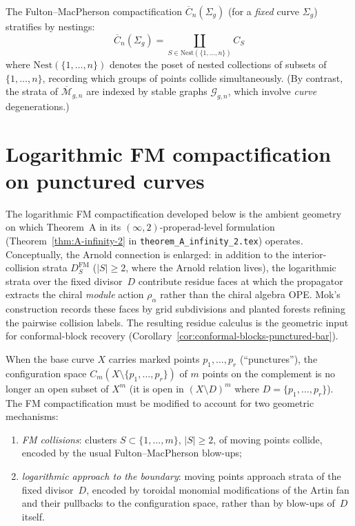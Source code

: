 The Fulton--MacPherson compactification $\overline{C}_n(\Sigma_g)$ (for a \emph{fixed} curve $\Sigma_g$) stratifies by nestings:
\[\overline{C}_n(\Sigma_g) = \coprod_{S \in \mathrm{Nest}(\{1,\ldots,n\})} C_S\]
where $\mathrm{Nest}(\{1,\ldots,n\})$ denotes the poset of nested collections of subsets of $\{1,\ldots,n\}$, recording which groups of points collide simultaneously. (By contrast, the strata of $\overline{\mathcal{M}}_{g,n}$ are indexed by stable graphs $\mathcal{G}_{g,n}$, which involve \emph{curve} degenerations.)

\section{Logarithmic FM compactification on punctured curves}
\label{sec:log-fm-punctured}

The logarithmic FM compactification developed below is the
ambient geometry on which Theorem~A in its
$(\infty,2)$-properad-level formulation
(Theorem~\ref{thm:A-infinity-2} in
\texttt{theorem\_A\_infinity\_2.tex}) operates. Conceptually,
the Arnold connection is enlarged: in addition to the
interior-collision strata $D_S^{\mathrm{FM}}$ ($|S|\geq2$, where
the Arnold relation lives), the logarithmic strata over the fixed
divisor~$D$ contribute residue faces at which the propagator extracts
the chiral \emph{module} action $\rho_\alpha$ rather than the chiral
algebra OPE. Mok's construction records these faces by grid
subdivisions and planted forests refining the pairwise collision labels.
The resulting residue calculus is the geometric input for
conformal-block recovery
(Corollary~\ref{cor:conformal-blocks-punctured-bar}).

When the base curve $X$ carries marked points $p_1, \ldots, p_r$
(``punctures''), the configuration space $C_m(X \setminus \{p_1,
\ldots, p_r\})$ of $m$ points on the complement is no longer an
open subset of $X^m$ (it is open in $(X \setminus D)^m$ where
$D = \{p_1, \ldots, p_r\}$). The FM compactification must be
modified to account for two geometric mechanisms:
\begin{enumerate}[label=(\roman*)]
\item \emph{FM collisions}: clusters $S\subset\{1,\ldots,m\}$,
 $|S|\geq2$, of moving points collide, encoded by the usual
 Fulton--MacPherson blow-ups;
\item \emph{logarithmic approach to the boundary}: moving points
 approach strata of the fixed divisor~$D$, encoded by toroidal
 monomial modifications of the Artin fan and their pullbacks to the
 configuration space, rather than by blow-ups of~$D$ itself.
\end{enumerate}

